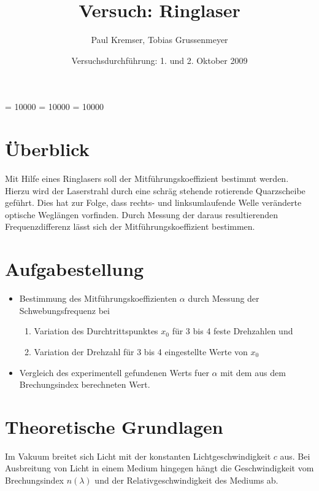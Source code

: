 \documentclass[12pt]{article}
\newcommand{\changefont}[3]{
\fontfamily{#1} \fontseries{#2} \fontshape{#3} \selectfont}
\begin{document}
\clubpenalty = 10000
\widowpenalty = 10000 
\displaywidowpenalty = 10000

\onehalfspacing
\changefont{ptm}{m}{n} 

\begin{titlepage}
\author{Paul Kremser, Tobias Grussenmeyer}
\title{Versuch: Ringlaser}
\date{Versuchsdurchführung: 1. und 2. Oktober 2009} 
\maketitle
\thispagestyle{empty}
\end{titlepage}


\tableofcontents
\thispagestyle{empty}
\newpage
{}
\section{Überblick}
Mit Hilfe eines Ringlasers soll der Mitführungskoeffizient bestimmt werden.
Hierzu wird der Laserstrahl durch eine schräg stehende rotierende Quarzscheibe geführt. Dies hat zur Folge,
dass rechts- und linksumlaufende Welle veränderte optische Weglängen vorfinden. Durch Messung der daraus resultierenden
Frequenzdifferenz lässt sich der Mitführungskoeffizient bestimmen.

\section{Aufgabestellung}
\begin{itemize}
 \item Bestimmung des Mitführungskoeffizienten $\alpha$ durch Messung der Schwebungsfrequenz bei
\begin{enumerate}
 \item Variation des Durchtrittspunktes $x_0$ für 3 bis 4 feste Drehzahlen und
 \item Variation der Drehzahl für 3 bis 4 eingestellte Werte von $x_0$
\end{enumerate}
 \item Vergleich des experimentell gefundenen Werts fuer $\alpha$ mit dem aus dem Brechungsindex berechneten Wert.
\end{itemize}

\section{Theoretische Grundlagen}
Im Vakuum breitet sich Licht mit der konstanten Lichtgeschwindigkeit $c$ aus. Bei Ausbreitung von Licht in einem Medium hingegen
hängt die Geschwindigkeit vom Brechungsindex $n(\lambda)$ und der Relativgeschwindigkeit des Mediums ab.
\end{document}

